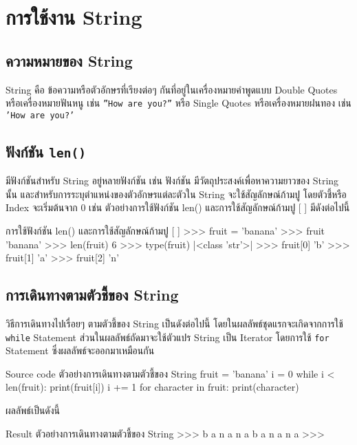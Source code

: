\chapter{การใช้งาน String}
\section{ความหมายของ String}

String คือ ข้อความหรือตัวอักษรที่เรียงต่อๆ กันที่อยู่ในเครื่องหมายคำพูดแบบ Double Quotes หรือเครื่องหมายฟันหนู เช่น \texttt{''How are you?''} หรือ Single Quotes หรือเครื่องหมายฝนทอง เช่น \texttt{'How are you?’}

\section{ฟังก์ชัน \texttt{len()}}

มีฟังก์ชันสำหรับ String อยู่หลายฟังก์ชัน เช่น ฟังก์ชัน  มีวัตถุประสงค์เพื่อหาความยาวของ String นั้น และสำหรับการระบุตำแหน่งของตัวอักษรแต่ละตัวใน String จะใช้สัญลักษณ์ก้ามปู \pyinline{[ ]} โดยตัวชี้หรือ Index จะเริ่มต้นจาก 0 เช่น  ตัวอย่างการใช้ฟังก์ชัน len() และการใช้สัญลักษณ์ก้ามปู [ ] มีดังต่อไปนี้

\begin{codelist}{การใช้ฟังก์ชัน len() และการใช้สัญลักษณ์ก้ามปู [ ]}{}
>>> fruit = 'banana'
>>> fruit
'banana'
>>> len(fruit)
6
>>> type(fruit)
|<class \rq{}str\rq{}>|
>>> fruit[0]
'b'
>>> fruit[1]
'a'
>>> fruit[2]
'n'
\end{codelist}


\section{การเดินทางตามตัวชี้ของ String}

วิธีการเดินทางไปเรื่อยๆ ตามตัวชี้ของ String เป็นดังต่อไปนี้ โดยในผลลัพธ์ชุดแรกจะเกิดจากการใช้ \texttt{while} Statement ส่วนในผลลัพธ์ถัดมาจะใช้ตัวแปร String เป็น Iterator โดยการใช้ \texttt{for} Statement ซึ่งผลลัพธ์จะออกมาเหมือนกัน


\begin{codelist}{Source code ตัวอย่างการเดินทางตามตัวชี้ของ String}{}
fruit = 'banana'
i = 0
while i < len(fruit):
    print(fruit[i])
    i += 1
for character in fruit: print(character)
\end{codelist}

ผลลัพธ์เป็นดังนี้

\begin{codelist}{Result ตัวอย่างการเดินทางตามตัวชี้ของ String}{}
>>>
b
a
n
a
n
a
b
a
n
a
n
a
>>>
\end{codelist}



